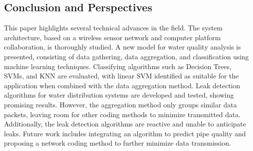 \documentclass[draft, {\secondLanguage}, english]{volcanica-template}
\begin{document}
\subsection{Conclusion and Perspectives}
This paper highlights several technical advances in the field. The system architecture, based on a wireless sensor network and computer platform collaboration, is thoroughly studied. A new model for water quality analysis is presented, consisting of data gathering, data aggregation, and classification using machine learning techniques. Classifying algorithms such as Decision Trees, SVMs, and KNN are evaluated, with linear SVM identified as suitable for the application when combined with the data aggregation method. Leak detection algorithms for water distribution systems are developed and tested, showing promising results. However, the aggregation method only groups similar data packets, leaving room for other coding methods to minimize transmitted data. Additionally, the leak detection algorithms are reactive and unable to anticipate leaks. Future work includes integrating an algorithm to predict pipe quality and proposing a network coding method to further minimize data transmission.

\EndMatter
\end{document}
